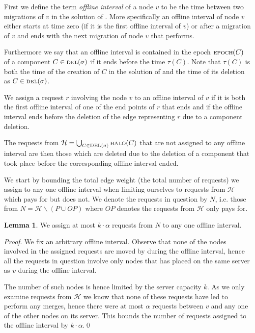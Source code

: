 \documentclass[a4paper,xcolor=dvipsnames, tikz, 12pt]{article}
\newcommand{\nl}{\newline}
\newcommand{\crep}{\text{C{\scriptsize REP}}}
\newcommand{\del}{\text{\scriptsize DEL}}
\newcommand{\opt}{\text{O{\scriptsize PT}}}
\newcommand{\halo}{\text{\scriptsize HALO}}
\newcommand{\epoch}{\text{\scriptsize EPOCH}}
\theoremstyle{definition}
\newtheorem{lemma}[defi]{Lemma}
\begin{document}
First we define the term \textit{offline interval} of a node $v$ to be the time between two migrations of $v$ in the solution of \opt{}. More specifically an offline interval of node $v$ either starts at time zero (if it is the first offline interval of $v$) or after a migration of $v$ and ends with the next migration of node $v$ that \opt{} performs.

Furthermore we say that an offline interval is contained in the epoch $\epoch(C)$ of a component $C\in\del{}(\sigma)$ if it ends before the time $\tau(C)$. Note that $\tau(C)$ is both the time of the creation of $C$ in the solution of \crep{} and the time of its deletion as $C\in\del{}(\sigma)$.

We assign a request $r$ involving the node $v$ to an offline interval of $v$ if it is both the first offline interval of one of the end points of $r$ that ends and if the offline interval ends before the deletion of the edge representing $r$ due to a component deletion.

The requests from $\mathcal{H}=\bigcup_{C\in\del{}(\sigma)}\halo{}(C)$ that are not assigned to any offline interval are then those which are deleted due to the deletion of a component that took place before the corresponding offline interval ended.

We start by bounding the total edge weight (the total number of requests) we assign to any one offline interval when limiting ourselves to requests from $\mathcal{H}$ which \crep{} pays for but \opt{} does not. We denote the requests in question by $N$, i.e. those from $N=\mathcal{H}\backslash (P\cup OP)$ where $OP$ denotes the requests from $\mathcal{H}$ only \opt{} pays for.


\begin{lemma}
	We assign at most $k\cdot\alpha$ requests from $N$ to any one offline interval.
\end{lemma}

\textit{Proof.} We fix an arbitrary offline interval. Observe that none of the nodes involved in the assigned requests are moved by \opt{} during the offline interval, hence all the requests in question involve only nodes that \opt{} has placed on the same server as $v$ during the offline interval. 

The number of such nodes is hence limited by the server capacity $k$. As we only examine requests from $\mathcal{H}$ we know that none of these requests have led \crep{} to perform any merges, hence there were at most $\alpha$ requests between $v$ and any one of the other nodes on its server. This bounds the number of requests assigned to the offline interval by $k\cdot\alpha$.\qed\nl
\end{document}
